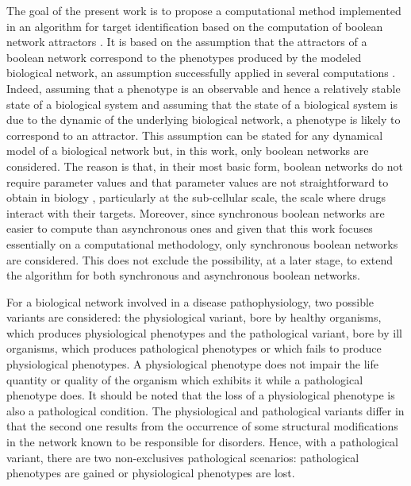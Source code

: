 \documentclass[oneside,a4paper,onecolumn,notitlepage]{article}
\begin{document}
The goal of the present work is to propose a computational method implemented in an algorithm for target identification based on the computation of boolean network attractors \cite{bornholdt2008boolean}. It is based on the assumption that the attractors of a boolean network correspond to the phenotypes produced by the modeled biological network, an assumption successfully applied in several computations \cite{huang2000shape,davidich2008boolean,faure2006dynamical,fumia2013boolean,creixell2012navigating,baverstock2011comparison}. Indeed, assuming that a phenotype is an observable and hence a relatively stable state of a biological system and assuming that the state of a biological system is due to the dynamic of the underlying biological network, a phenotype is likely to correspond to an attractor. This assumption can be stated for any dynamical model of a biological network but, in this work, only boolean networks are considered. The reason is that, in their most basic form, boolean networks do not require parameter values and that parameter values are not straightforward to obtain in biology \cite{wynn2012logic}, particularly at the sub-cellular scale, the scale where drugs interact with their targets. Moreover, since synchronous boolean networks are easier to compute than asynchronous ones \cite{garg2008synchronous} and given that this work focuses essentially on a computational methodology, only synchronous boolean networks are considered. This does not exclude the possibility, at a later stage, to extend the algorithm for both synchronous and asynchronous boolean networks.

For a biological network involved in a disease pathophysiology, two possible variants are considered: the physiological variant, bore by healthy organisms, which produces physiological phenotypes and the pathological variant, bore by ill organisms, which produces pathological phenotypes or which fails to produce physiological phenotypes. A physiological phenotype does not impair the life quantity or quality of the organism which exhibits it while a pathological phenotype does. It should be noted that the loss of a physiological phenotype is also a pathological condition. The physiological and pathological variants differ in that the second one results from the occurrence of some structural modifications in the network known to be responsible for disorders. Hence, with a pathological variant, there are two non-exclusives pathological scenarios: pathological phenotypes are gained or physiological phenotypes are lost.
\end{document}
